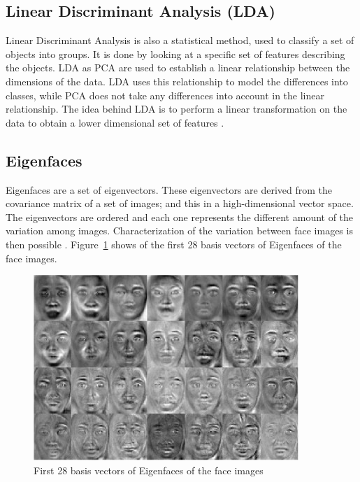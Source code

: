 \subsection{Linear Discriminant Analysis (LDA)}

\vspace{\baselineskip}
\noindent Linear Discriminant Analysis is also a statistical method, used to classify a set of objects into groups. It is done by looking at a specific set of features describing the objects. LDA as PCA are used to establish a linear relationship between the dimensions of the data. LDA uses this relationship to model the differences into classes, while PCA does not take any differences into account in the linear relationship. The idea behind LDA  is to perform a linear transformation on the data to obtain a lower dimensional set of features \cite{GAN08}. \newline

\subsection{Eigenfaces}

\vspace{\baselineskip}
\noindent Eigenfaces are a set of eigenvectors. These eigenvectors are derived from the covariance matrix of a set of images; and this in a high-dimensional vector space. The eigenvectors are ordered and each one represents the different amount of the variation among images. Characterization of the variation between face images is then possible \cite{TUR91}. Figure~\ref{eigenface_example} shows of the first 28 basis vectors of Eigenfaces of the face images.
\newline

\begin{figure}[!h]
\begin{center}
\noindent \includegraphics[scale=1]{figures/eigenface_example} 
\newline
\caption{First 28 basis vectors of Eigenfaces of the face images}
\label{eigenface_example}
\end{center} 
\end{figure}

